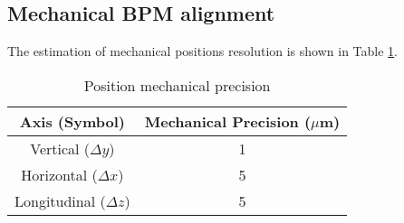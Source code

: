 \subsection{Mechanical BPM alignment}\label{s:mechanical}
The estimation of mechanical positions resolution is shown in Table \ref{mechprec}.\par
\begin{table}[htb]
\begin{center}
 \begin{tabular}{|c|c|}\hline
  Axis (Symbol) & Mechanical Precision ($\mu$m)\\\hline
  Vertical ($\Delta y$)& 1\\
  Horizontal ($\Delta x$) & 5\\
  Longitudinal ($\Delta z$) & 5 \\\hline
 \end{tabular}\caption{Position mechanical precision}\label{mechprec}
 \end{center}
\end{table}\par
\pagebreak
